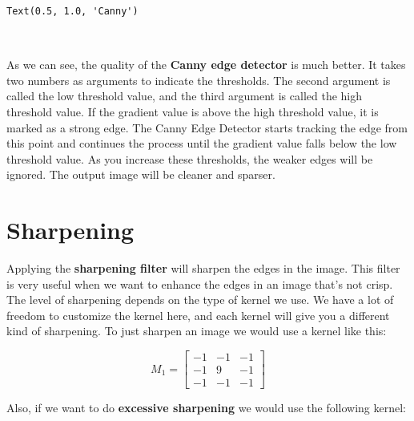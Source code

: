 \begin{tcolorbox}[breakable, size=fbox, boxrule=.5pt, pad at break*=1mm, opacityfill=0]
	\begin{Verbatim}[commandchars=\\\{\}]
Text(0.5, 1.0, 'Canny')
	\end{Verbatim}
\end{tcolorbox}

\begin{center}
\end{center}
{ \hspace*{\fill} \\}

As we can see, the quality of the \textbf{Canny edge detector} is much better. It takes two numbers as arguments to indicate the thresholds. The second argument is called the low threshold value, and the third argument is called the high threshold value. If the gradient value is above the high threshold value, it is marked as a strong edge. The Canny Edge Detector starts tracking the edge from this point and continues the process until the gradient value falls below the low threshold value. As you increase these thresholds, the weaker edges will be ignored. The output image will be cleaner and sparser.

\section{Sharpening}
Applying the \textbf{sharpening filter} will sharpen the edges in the image. This filter is very useful when we want to enhance the edges in an image that's not crisp. The level of sharpening depends on the type of kernel we use. We have a lot of freedom to customize the kernel here, and each kernel will give you a different kind of sharpening. To just sharpen an image we would use a kernel like this:

\begin{center}
	\[
	\textit{$M_1$} =  
	\begin{bmatrix}
		-1 & -1 & -1 \\
		-1 & 9 & -1 \\
		-1 & -1 & -1
	\end{bmatrix}
	\]
\end{center}

Also, if we want to do \textbf{excessive sharpening} we would use the following kernel:

